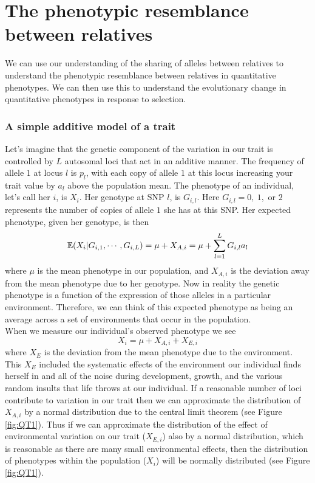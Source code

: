 \chapter{The phenotypic resemblance between relatives}

We can use our understanding of the sharing of alleles between relatives
to understand the phenotypic resemblance between relatives in
quantitative phenotypes. We can then use this to understand the
evolutionary change in quantitative phenotypes in response to selection. \\

\subsection{A simple additive model of a trait}
Let's imagine that the genetic component of the variation in our trait
is controlled by $L$ autosomal loci that act in an additive manner. The frequency of allele $1$ at locus $l$ is $p_l$, with each copy of
allele $1$ at this locus increasing your trait value by $a_l$ above
the population mean.
The phenotype of an individual, let's call her $i$, is $X_i$.
Her genotype at SNP $l$, is
$G_{i,l}$. Here $G_{i,l}=0,~1,$ or $2$  represents the number of copies of allele $1$ she
has at this SNP. Her expected phenotype, given her genotype, is then
\begin{equation}
\mathbb{E} (X_i | G_{i,1},\cdots,G_{i,L}) =\mu + X_{A,i} = \mu+\sum_{l=1}^L G_{i,l} a_{l} \label{pheno_geno}
\end{equation}
where $\mu$ is the mean phenotype in our population, and $X_{A,i}$ is
the deviation away from the mean phenotype due to her genotype. Now in reality the genetic phenotype is a function of the
expression of those alleles in a particular environment. Therefore, we
can think of this expected phenotype as being an average across a set
of environments that occur in the population. \\



When we measure our individual's observed phenotype we see
\begin{equation}
X_i =   \mu+X_{A,i} + X_{E,i} \label{pheno_geno_environ}
\end{equation}
where $X_E$ is the deviation from the mean phenotype due to the
environment. This $X_E$ included the systematic effects of the environment
our individual finds herself in and all of the noise during
development, growth, and the various random insults that life throws
at our individual. If a reasonable number of loci contribute to
variation in our trait then we can approximate the distribution of
$X_{A,i}$ by a normal distribution due to the central limit theorem (see Figure \ref{fig:QT1}). Thus if we can
approximate the distribution of the effect of environmental variation
on our trait ($X_{E,i}$) also by a normal distribution, which is
reasonable as there are many small environmental effects, then the
distribution of phenotypes within the population ($X_i$) will be
normally distributed (see Figure \ref{fig:QT1}).\\

